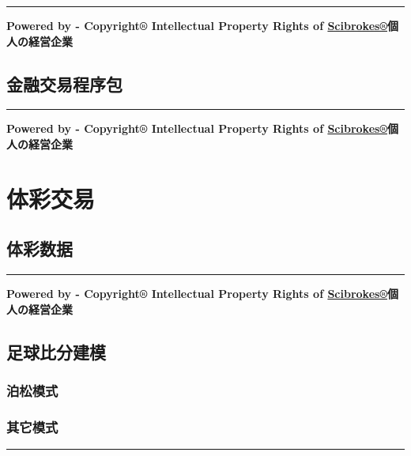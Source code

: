 \documentclass[]{book}
\theoremstyle{definition}
\theoremstyle{definition}
\theoremstyle{definition}
\theoremstyle{remark}
\begin{document}
\begin{center}\rule{0.5\linewidth}{\linethickness}\end{center}

\textbf{Powered by - Copyright® Intellectual Property Rights of
\href{http://www.scibrokes.com}{Scibrokes®}個人の経営企業}

\section{金融交易程序包}

\begin{center}\rule{0.5\linewidth}{\linethickness}\end{center}

\textbf{Powered by - Copyright® Intellectual Property Rights of
\href{http://www.scibrokes.com}{Scibrokes®}個人の経営企業}

\hypertarget{sportsbook}{%
\chapter{体彩交易}\label{sportsbook}}

\section{体彩数据}

\begin{center}\rule{0.5\linewidth}{\linethickness}\end{center}

\textbf{Powered by - Copyright® Intellectual Property Rights of
\href{http://www.scibrokes.com}{Scibrokes®}個人の経営企業}

\section{足球比分建模}

\subsection{泊松模式}

\subsection{其它模式}

\begin{center}\rule{0.5\linewidth}{\linethickness}\end{center}
\end{document}
